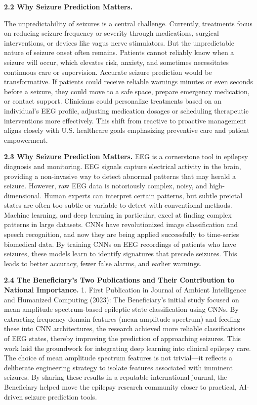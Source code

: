 \documentclass{article}
\begin{document}
{\bf 2.2 Why Seizure Prediction Matters. }

The unpredictability of seizures is a central challenge. Currently, treatments focus on reducing seizure frequency or severity through medications, surgical interventions, or devices like vagus nerve stimulators. But the unpredictable nature of seizure onset often remains. Patients cannot reliably know when a seizure will occur, which elevates risk, anxiety, and sometimes necessitates continuous care or supervision.
Accurate seizure prediction would be transformative. If patients could receive reliable warnings minutes or even seconds before a seizure, they could move to a safe space, prepare emergency medication, or contact support. Clinicians could personalize treatments based on an individual’s EEG profile, adjusting medication dosages or scheduling therapeutic interventions more effectively. This shift from reactive to proactive management aligns closely with U.S. healthcare goals emphasizing preventive care and patient empowerment.

{\bf 2.3 Why Seizure Prediction Matters. }
EEG is a cornerstone tool in epilepsy diagnosis and monitoring. EEG signals capture electrical activity in the brain, providing a non-invasive way to detect abnormal patterns that may herald a seizure. However, raw EEG data is notoriously complex, noisy, and high-dimensional. Human experts can interpret certain patterns, but subtle preictal states are often too subtle or variable to detect with conventional methods.
Machine learning, and deep learning in particular, excel at finding complex patterns in large datasets. CNNs have revolutionized image classification and speech recognition, and now they are being applied successfully to time-series biomedical data. By training CNNs on EEG recordings of patients who have seizures, these models learn to identify signatures that precede seizures. This leads to better accuracy, fewer false alarms, and earlier warnings.

{\bf 2.4 The Beneficiary’s Two Publications and Their Contribution to National Importance. }
1. First Publication in Journal of Ambient Intelligence and Humanized Computing (2023):
The Beneficiary’s initial study focused on mean amplitude spectrum-based epileptic state classification using CNNs. By extracting frequency-domain features (mean amplitude spectrum) and feeding these into CNN architectures, the research achieved more reliable classifications of EEG states, thereby improving the prediction of approaching seizures. This work laid the groundwork for integrating deep learning into clinical epilepsy care. The choice of mean amplitude spectrum features is not trivial—it reflects a deliberate engineering strategy to isolate features associated with imminent seizures. By sharing these results in a reputable international journal, the Beneficiary helped move the epilepsy research community closer to practical, AI-driven seizure prediction tools.
\end{document}
